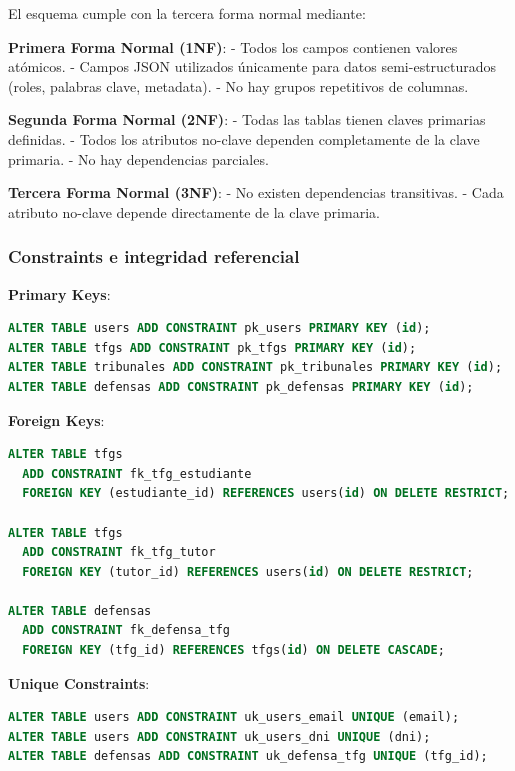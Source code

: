 \documentclass[12pt,a4paper,oneside]{report}
\begin{document}
El esquema cumple con la tercera forma normal mediante:

\textbf{Primera Forma Normal (1NF)}: - Todos los campos contienen
valores atómicos. - Campos JSON utilizados únicamente para datos
semi-estructurados (roles, palabras clave, metadata). - No hay grupos
repetitivos de columnas.

\textbf{Segunda Forma Normal (2NF)}: - Todas las tablas tienen claves
primarias definidas. - Todos los atributos no-clave dependen
completamente de la clave primaria. - No hay dependencias parciales.

\textbf{Tercera Forma Normal (3NF)}: - No existen dependencias
transitivas. - Cada atributo no-clave depende directamente de la clave
primaria.

\subsubsection{Constraints e integridad
referencial}\label{constraints-e-integridad-referencial}

\textbf{Primary Keys}:

\begin{lstlisting}[language=SQL]
ALTER TABLE users ADD CONSTRAINT pk_users PRIMARY KEY (id);
ALTER TABLE tfgs ADD CONSTRAINT pk_tfgs PRIMARY KEY (id);
ALTER TABLE tribunales ADD CONSTRAINT pk_tribunales PRIMARY KEY (id);
ALTER TABLE defensas ADD CONSTRAINT pk_defensas PRIMARY KEY (id);
\end{lstlisting}

\textbf{Foreign Keys}:

\begin{lstlisting}[language=SQL]
ALTER TABLE tfgs 
  ADD CONSTRAINT fk_tfg_estudiante 
  FOREIGN KEY (estudiante_id) REFERENCES users(id) ON DELETE RESTRICT;

ALTER TABLE tfgs 
  ADD CONSTRAINT fk_tfg_tutor 
  FOREIGN KEY (tutor_id) REFERENCES users(id) ON DELETE RESTRICT;

ALTER TABLE defensas 
  ADD CONSTRAINT fk_defensa_tfg 
  FOREIGN KEY (tfg_id) REFERENCES tfgs(id) ON DELETE CASCADE;
\end{lstlisting}

\textbf{Unique Constraints}:

\begin{lstlisting}[language=SQL]
ALTER TABLE users ADD CONSTRAINT uk_users_email UNIQUE (email);
ALTER TABLE users ADD CONSTRAINT uk_users_dni UNIQUE (dni);
ALTER TABLE defensas ADD CONSTRAINT uk_defensa_tfg UNIQUE (tfg_id);
\end{lstlisting}
\end{document}
